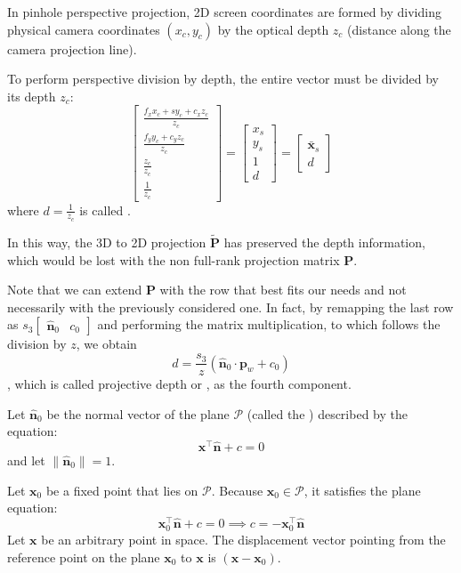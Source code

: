In pinhole perspective projection, 2D screen coordinates are formed by dividing physical camera coordinates $(x_c, y_c)$ by the optical depth $z_c$ (distance along the camera projection line).

To perform perspective division by depth, the entire vector must be divided by its depth $z_{c}$:
$$\begin{bmatrix} \frac{f_x x_c + s y_c + c_x z_c}{z_c} \\ \frac{f_y y_c + c_y z_c}{z_c} \\ \frac{z_c}{z_c} \\ \frac{1}{z_c} \end{bmatrix} = \begin{bmatrix} x_s \\ y_s \\ 1 \\ d \end{bmatrix}=\begin{bmatrix}
\bar{\mathbf{x}}_{s} \\
d
\end{bmatrix}$$
where $d=\frac{1}{z_{c}}$ is called .

In this way, the 3D to 2D projection $\tilde{\mathbf{P}}$ has preserved the depth information, which would be lost with the non full-rank projection matrix $\mathbf{P}$.

Note that we can extend $\mathbf{P}$ with the row that best fits our needs and not necessarily with the previously considered one. In fact, by remapping the last row as $s_{3}\begin{bmatrix}\hat{\mathbf{n}}_{0} & c_{0}\end{bmatrix}$ and performing the matrix multiplication, to which follows the division by $z$, we obtain
$$d = \frac{s_3}{z} (\hat{\mathbf{n}}_0 \cdot \mathbf{p}_w + c_0)$$
, which is called projective depth or , as the fourth component. 

Let $\hat{\mathbf{n}}_{0}$ be the normal vector of the plane $\mathcal{P}$ (called the ) described by the equation:
$$\mathbf{x}^{\top}\hat{\mathbf{n}} + c = 0$$
and let $\| \hat{\mathbf{n}}_{0} \|=1$.

Let $\mathbf{x}_0$ be a fixed point that lies on $\mathcal{P}$. Because $\mathbf{x}_0 \in \mathcal{P}$, it satisfies the plane equation:
$$\mathbf{x}_0^{\top}\hat{\mathbf{n}} + c = 0 \implies c = -\mathbf{x}_0^{\top}\hat{\mathbf{n}}$$
Let $\mathbf{x}$ be an arbitrary point in space. The displacement vector pointing from the reference point on the plane $\mathbf{x}_0$ to $\mathbf{x}$ is $(\mathbf{x} - \mathbf{x}_0)$.

